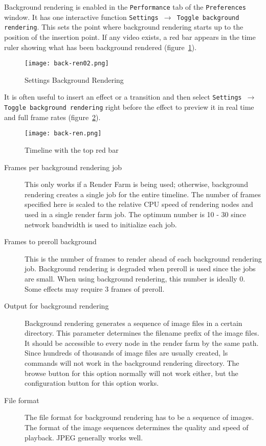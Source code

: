 Background rendering is enabled in the \texttt{Performance} tab of the \texttt{Preferences} window. It has one interactive function \texttt{Settings $\rightarrow$ Toggle background rendering}. This sets the point where background rendering starts up to the position of the insertion point. If any video exists, a red bar appears in the time ruler showing what has been background rendered (figure~\ref{fig:back-ren02}).

\begin{figure}[htpb]
    \centering
    \texttt{[image: back-ren02.png]}
    \caption{Settings Background Rendering}
    \label{fig:back-ren02}
\end{figure}

It is often useful to insert an effect or a transition and then select \texttt{Settings $\rightarrow$ Toggle background rendering} right before the effect to preview it in real time and full frame rates (figure~\ref{fig:back-ren}).

\begin{figure}[htpb]
    \centering
    \texttt{[image: back-ren.png]}
    \caption{Timeline with the top red bar}
    \label{fig:back-ren}
\end{figure}

\begin{description}
    \item[Frames per background rendering job] This only works if a Render Farm is being used; otherwise, background rendering creates a single job for the entire timeline. The number of frames specified here is scaled to the relative CPU speed of rendering nodes and used in a single render farm job. The optimum number is 10 - 30 since network bandwidth is used to initialize each job.
    \item[Frames to preroll background] This is the number of frames to render ahead of each background rendering job. Background rendering is degraded when preroll is used since the jobs are small. When using background rendering, this number is ideally 0. Some effects may require 3 frames of preroll.
    \item[Output for background rendering] Background rendering generates a sequence of image files in a certain directory. This parameter determines the filename prefix of the image files. It should be accessible to every node in the render farm by the same path. Since hundreds of thousands of image files are usually created, ls commands will not work in the background rendering directory. The browse button for this option normally will not work either, but the configuration button for this option works.
    \item[File format] The file format for background rendering has to be a sequence of images. The format of the image sequences determines the quality and speed of playback. JPEG generally works well.
\end{description}


